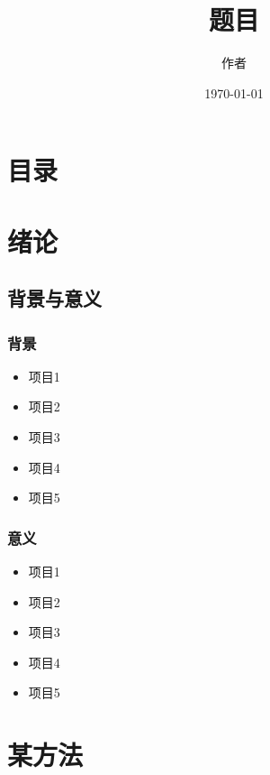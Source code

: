 \documentclass{beamer}
\begin{document}
\songti

\title{题目}
\author{作者}
\date{\today}

\frame{\titlepage}

\section*{目录}
\begin{frame}
  \frametitle{\secname}
  \tableofcontents
\end{frame}


\section{绪论}

\subsection{背景与意义}

\begin{frame}
  \frametitle{背景}
        \begin{itemize}[<+-|alert@+>]
        \item
        项目1
        \item
        项目2
        \item
        项目3
        \item
        项目4
        \item
        项目5
        \end{itemize}
\end{frame}

\begin{frame}
  \frametitle{意义}
        \begin{itemize}[<+-|alert@+>]
        \item
        项目1
        \item
        项目2
        \item
        项目3
        \item
        项目4
        \item
        项目5
        \end{itemize}
\end{frame}

\section{某方法}
\end{document}
